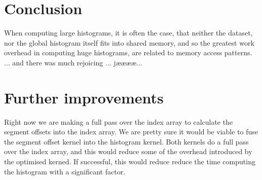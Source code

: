 \documentclass[12pt, a4paper, hidelinks]{article}
\begin{document}
\section{Conclusion}
When computing large histograms,
it is often the case, that neither the dataset,
nor the global histogram itself fits into shared memory,
and so the greatest work overhead in computing huge histograms,
are related to memory access patterns. ... and there was much rejoicing ... jææææ...

\section{Further improvements}
Right now we are making a full pass over the index array to calculate
the segment offsets into the index array.
We are pretty sure it would be viable to fuse the segment offset
kernel into the histogram kernel.
Both kernels do a full pass over the index array,
and this would reduce some of the overhead introduced
by the optimised kerned. If successful,
this would reduce reduce the time computing the histogram with a significant factor.


\end{document}

